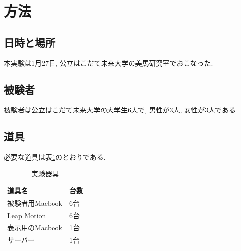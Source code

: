 \documentclass{funthesis}
\begin{document}




\section{方法}
\subsection{日時と場所}

本実験は1月27日, 公立はこだて未来大学の美馬研究室でおこなった. 

\subsection{被験者}
被験者は公立はこだて未来大学の大学生6人で, 男性が3人, 女性が3人である. 

\subsection{道具}
必要な道具は表\ref{tools}のとおりである. 

\begin{table}[H]
\begin{center}
\caption{実験器具}
  \begin{tabular}{ll}
   \hline
   道具名 & 台数\\
   \hline
   被験者用Macbook & 6台\\
   \hline
   Leap Motion & 6台\\ 
   \hline
   表示用のMacbook & 1台\\ 
   \hline
  サーバー & 1台\\ 
   \hline
   \end{tabular}
   \label{tools}
  \end{center}
\end{table}
\end{document}
